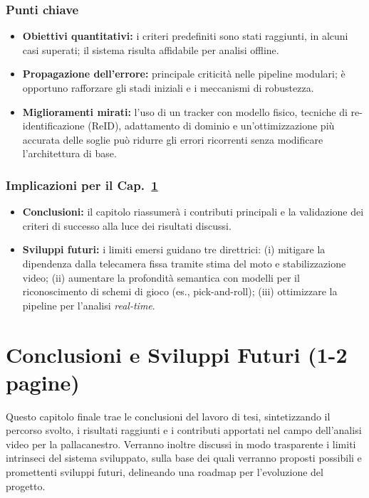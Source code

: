 \documentclass[12pt,a4paper,openright,twoside]{book}
\begin{document}
\subsection*{Punti chiave}
\begin{itemize}
  \item \textbf{Obiettivi quantitativi:} i criteri predefiniti sono 
  stati raggiunti, in alcuni casi superati; il sistema risulta 
  affidabile per analisi offline.
  \item \textbf{Propagazione dell'errore:} principale criticità nelle pipeline modulari; 
  è opportuno rafforzare gli stadi iniziali e i meccanismi di robustezza.
  \item \textbf{Miglioramenti mirati:} l'uso di un tracker con modello fisico, 
  tecniche di re-identificazione (ReID), adattamento di dominio e un'ottimizzazione 
  più accurata delle soglie può ridurre gli errori ricorrenti senza modificare 
  l'architettura di base.
\end{itemize}

\subsection*{Implicazioni per il Cap.~\ref{chap:conclusioni-sviluppi-futuri}}
\begin{itemize}
  \item \textbf{Conclusioni:} il capitolo riassumerà i contributi 
  principali e la validazione dei criteri di successo alla luce 
  dei risultati discussi.
  \item \textbf{Sviluppi futuri:} i limiti emersi guidano tre direttrici: 
    (i) mitigare la dipendenza dalla telecamera fissa tramite stima 
    del moto e stabilizzazione video; 
    (ii) aumentare la profondità semantica con modelli per il riconoscimento 
    di schemi di gioco (es., pick-and-roll); 
    (iii) ottimizzare la pipeline per l'analisi \emph{real-time}.
\end{itemize}

\chapter{Conclusioni e Sviluppi Futuri (1-2 pagine)}
\label{chap:conclusioni-sviluppi-futuri}

Questo capitolo finale trae le conclusioni del lavoro di tesi,
sintetizzando il percorso svolto, i risultati raggiunti e i
contributi apportati nel campo dell'analisi video per la
pallacanestro. Verranno inoltre discussi in modo trasparente i
limiti intrinseci del sistema sviluppato, sulla base dei quali
verranno proposti possibili e promettenti sviluppi futuri,
delineando una roadmap per l'evoluzione del progetto.
\end{document}
